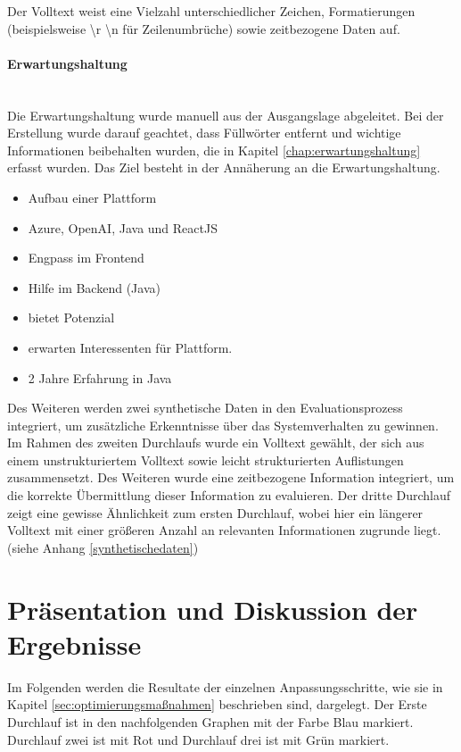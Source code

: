 Der Volltext weist eine Vielzahl unterschiedlicher Zeichen, Formatierungen (beispielsweise \textbackslash r \textbackslash n für Zeilenumbrüche) sowie zeitbezogene Daten auf.
\paragraph{Erwartungshaltung}\mbox{}\\
Die Erwartungshaltung wurde manuell aus der Ausgangslage abgeleitet. Bei der Erstellung wurde darauf geachtet, dass Füllwörter entfernt und wichtige Informationen beibehalten wurden, die in Kapitel \ref{chap:erwartungshaltung} erfasst wurden. Das Ziel besteht in der Annäherung an die Erwartungshaltung.
\begin{itemize}
	\itemsep-0.5em
	\item Aufbau einer Plattform
	\item Azure, OpenAI, Java und ReactJS
	\item Engpass im Frontend
	\item Hilfe im Backend (Java)
	\item bietet Potenzial
	\item erwarten Interessenten für Plattform.
	\item 2 Jahre Erfahrung in Java
\end{itemize}
Des Weiteren werden zwei synthetische Daten in den Evaluationsprozess integriert, um zusätzliche Erkenntnisse über das Systemverhalten zu gewinnen. Im Rahmen des zweiten Durchlaufs wurde ein Volltext gewählt, der sich aus einem unstrukturiertem Volltext sowie leicht strukturierten Auflistungen zusammensetzt. Des Weiteren wurde eine zeitbezogene Information integriert, um die korrekte Übermittlung dieser Information zu evaluieren. Der dritte Durchlauf zeigt eine gewisse Ähnlichkeit zum ersten Durchlauf, wobei hier ein längerer Volltext mit einer größeren Anzahl an relevanten Informationen zugrunde liegt. (siehe Anhang \ref{synthetischedaten})
\section{Präsentation und Diskussion der Ergebnisse}
Im Folgenden werden die Resultate der einzelnen Anpassungsschritte, wie sie in Kapitel \ref{sec:optimierungsmaßnahmen} beschrieben sind, dargelegt. Der Erste Durchlauf ist in den nachfolgenden Graphen mit der Farbe Blau markiert. Durchlauf zwei ist mit Rot und Durchlauf drei ist mit Grün markiert.
